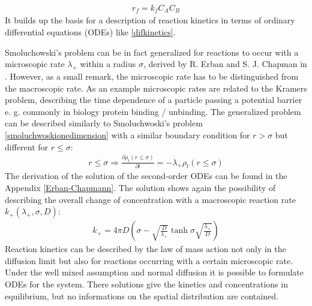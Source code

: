 \documentclass[
  a4paper,BCOR10mm,oneside,
  headsepline,footsepline,%
  fleqn,openbib
]{scrbook}
\begin{document}
\begin{align}
 r_f=k_f C_A C_B
\end{align}
It builds up the basis for a description of reaction kinetics in terms of ordinary differential equations (ODEs) like \cref{difkinetics}.\par
Smoluchowski's problem can be in fact generalized for reactions to occur with a microscopic rate $\lambda_{+}$ within a radius $\sigma$, derived by R. Erban and S. J. Chapman in \cite{Erban2009}.  However, as a small remark, the microscopic rate has to be distinguished from the macroscopic rate. As an example microscopic rates are related to the Kramers problem, describing the time dependence of a particle passing a potential barrier e. g. commonly in biology protein binding / unbinding. The generalized problem can be described similarly to Smoluchwoski's problem \cref{smoluchwoskionedimension}  with a similar boundary condition for $r > \sigma$ but different for $r \leq \sigma$:
\begin{align}
r\leq \sigma \Rightarrow \frac{\partial \rho_t(r \leq \sigma)}{\partial t}=-\lambda_{+} \rho_t (r \leq \sigma)
\end{align}
The derivation of the solution of the second-order ODEs can be found in the Appendix \ref{Erban-Chapmann}. The solution shows again the possibility of describing the overall change of concentration with a macroscopic reaction rate $k_{+}(\lambda_{+},\sigma,D)$:
\begin{align} \label{kalphaerbanchepmann}
k_{+}=4 \pi D \left( \sigma-\sqrt{\frac{D}{\lambda_{+}}} \tanh{\sigma \sqrt{\frac{\lambda_{+}}{D}}}\right)
\end{align}
Reaction kinetics can be described by the law of mass action not only in the diffusion limit but also for reactions occurring with a certain microscopic rate.  Under the well mixed assumption and normal diffusion it is possible to formulate ODEs for the system. There solutions give the kinetics and concentrations in equilibrium, but no informations on the spatial distribution are contained.
\end{document}

